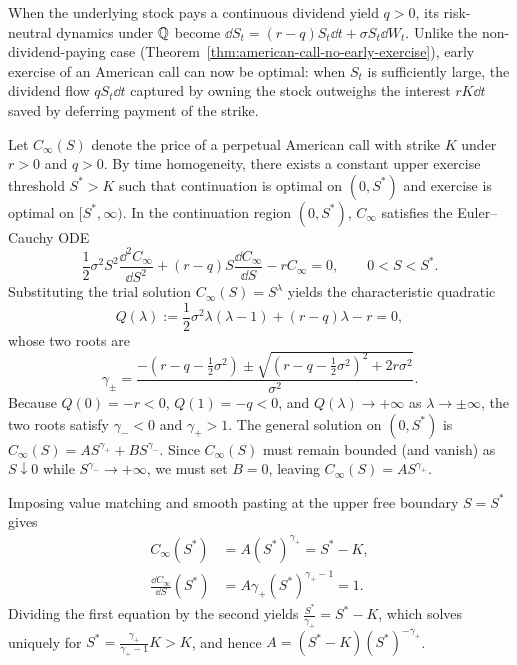 When the underlying stock pays a continuous dividend yield $q > 0$, its risk-neutral dynamics under $\mathbb{Q}$ become $\dd S_t = (r - q) S_t \dd t + \sigma S_t \dd W_t$. Unlike the non-dividend-paying case (Theorem~\ref{thm:american-call-no-early-exercise}), early exercise of an American call can now be optimal: when $S_t$ is sufficiently large, the dividend flow $q S_t \dd t$ captured by owning the stock outweighs the interest $r K \dd t$ saved by deferring payment of the strike.

Let $C_\infty(S)$ denote the price of a perpetual American call with strike $K$ under $r > 0$ and $q > 0$. By time homogeneity, there exists a constant upper exercise threshold $S^* > K$ such that continuation is optimal on $(0, S^*)$ and exercise is optimal on $[S^*, \infty)$. In the continuation region $(0, S^*)$, $C_\infty$ satisfies the Euler--Cauchy ODE
\begin{equation}\label{eq:perpetual-call-ode}
    \frac{1}{2}\sigma^2 S^2 \frac{\dd^2 C_\infty}{\dd S^2} + (r - q) S \frac{\dd C_\infty}{\dd S} - r C_\infty = 0, \qquad 0 < S < S^*.
\end{equation}
Substituting the trial solution $C_\infty(S) = S^\lambda$ yields the characteristic quadratic
\[
Q(\lambda) := \frac{1}{2}\sigma^2 \lambda(\lambda - 1) + (r - q)\lambda - r = 0,
\]
whose two roots are
\[
\gamma_{\pm} = \frac{-\left(r - q - \frac{1}{2}\sigma^2\right) \pm \sqrt{\left(r - q - \frac{1}{2}\sigma^2\right)^2 + 2r\sigma^2}}{\sigma^2}.
\]
Because $Q(0) = -r < 0$, $Q(1) = -q < 0$, and $Q(\lambda) \to +\infty$ as $\lambda \to \pm\infty$, the two roots satisfy $\gamma_- < 0$ and $\gamma_+ > 1$. The general solution on $(0, S^*)$ is $C_\infty(S) = A S^{\gamma_+} + B S^{\gamma_-}$. Since $C_\infty(S)$ must remain bounded (and vanish) as $S \downarrow 0$ while $S^{\gamma_-} \to +\infty$, we must set $B = 0$, leaving $C_\infty(S) = A S^{\gamma_+}$.

Imposing value matching and smooth pasting at the upper free boundary $S = S^*$ gives
\[
\begin{aligned}
    C_\infty(S^*) &= A (S^*)^{\gamma_+} = S^* - K, \\
    \frac{\dd C_\infty}{\dd S}(S^*) &= A \gamma_+ (S^*)^{\gamma_+ - 1} = 1.
\end{aligned}
\]
Dividing the first equation by the second yields $\frac{S^*}{\gamma_+} = S^* - K$, which solves uniquely for $S^* = \frac{\gamma_+}{\gamma_+ - 1} K > K$, and hence $A = (S^* - K)(S^*)^{-\gamma_+}$.

